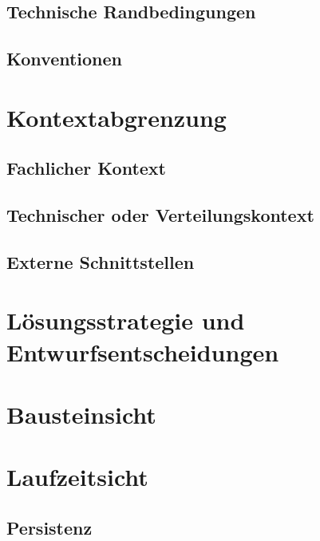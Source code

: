 \documentclass[pdftex,12pt,a4paper]{article}
\begin{document}
\subsection{Technische Randbedingungen}

\subsection{Konventionen}

\section{Kontextabgrenzung}

\subsection{Fachlicher Kontext}

\subsection{Technischer oder Verteilungskontext}

\subsection{Externe Schnittstellen}

\section{Lösungsstrategie und Entwurfsentscheidungen}

\section{Bausteinsicht}

\section{Laufzeitsicht}

\subsection{Persistenz}

\end{document}
